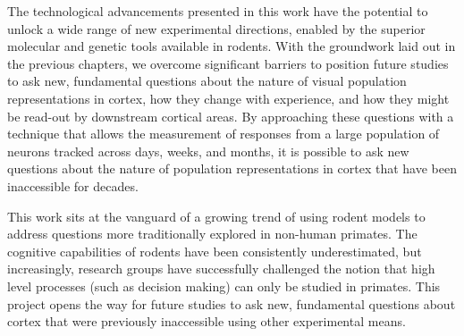 The technological advancements presented in this work have the potential to unlock a wide range of new experimental directions, enabled by the superior molecular and genetic tools available in rodents. With the groundwork laid out in the previous chapters, we overcome significant barriers to position future studies to ask new, fundamental questions about the nature of visual population representations in cortex, how they change with experience, and how they might be read-out by downstream cortical areas. By approaching these questions with a technique that allows the measurement of responses from a large population of neurons tracked across days, weeks, and months, it is possible to ask new questions about the nature of population representations in cortex that have been inaccessible for decades. 

This work sits at the vanguard of a growing trend of using rodent models to address questions more traditionally explored in non-human primates.  The cognitive capabilities of rodents have been consistently underestimated, but increasingly, research groups have successfully challenged the notion that high level processes (such as decision making) can only be studied in primates. This project opens the way for future studies to ask new, fundamental questions about cortex that were previously inaccessible using other experimental means. 